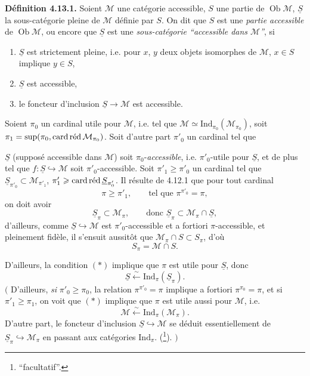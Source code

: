 \documentclass[11pt]{article}
\newcommand{\printedpage}[1]{\marginpar{\footnotesize p.~#1}}
\newcommand{\msp}[1]{\marginpar{\footnotesize [#1]}}
\newcommand{\Ind}{\mathrm{Ind}}
\newcommand{\Ob}{\operatorname{Ob}}
\newcommand{\card}{\operatorname{card}}
\newcommand{\M}{\mathcal{M}}
\newcommand{\red}{\mathop{\textup{réd}}\nolimits}
\newcommand{\uS}{\underline{S}}
\begin{document}
\textbf{Définition 4.13.1.} Soient $\M$ une catégorie accessible, $S$ une partie de $\Ob\M$, $\uS$ la sous-catégorie pleine de $\M$ définie par $S$. On dit que $S$ est une \textit{partie accessible} de $\Ob\M$, ou encore que $\uS$ est une \textit{sous-catégorie “accessible dans $\M$”}, si
\printedpage{105}
\begin{enumerate}
\item[a)] $\uS$ est strictement pleine, i.e. pour $x$, $y$ deux objets isomorphes de $\M$, $x \in S$ implique $y \in S$,
\item[b)] $\uS$ est accessible,
\item[c)] le foncteur d'inclusion $\uS \longrightarrow \M$ est accessible.
\end{enumerate}
Soient $\pi_0$ un cardinal utile pour $\M$, i.e. tel que $\M \simeq \Ind_{\pi_0}(\M_{\pi_0})$, soit $\pi_1 = \sup(\pi_0, \card\red\M_{\pi_0})$. Soit d'autre part $\pi'_0$ un cardinal tel que

\msp{page 282}
$\uS$ (supposé accessible dans $\M$) soit $\pi_0$-\textit{accessible}, i.e. $\pi'_0$-utile pour $\uS$, et de plus tel %
que $f : \uS \hookrightarrow \M$ soit $\pi'_0$-accessible. Soit $\pi'_1 \geqslant \pi'_0$ un cardinal tel que $\uS_{\pi'_0} \subset \M_{\pi'_1}$, $\pi'_1 \geqslant \card\red\uS_{\pi'_0}$. Il résulte de 4.12.1 que pour tout cardinal
\[
\pi \geqslant \pi'_1 , \qquad \text{tel que } \pi^{\pi'_0} = \pi, \tag*{$(*)$}
\]
on doit avoir
\[
\uS_\pi \subset \M_\pi , \qquad \text{donc } \uS_\pi \subset \M_\pi \cap \uS,
\]
d'ailleurs, comme $\uS \hookrightarrow \M$ est $\pi'_0$-accessible et a fortiori $\pi$-accessible, et pleinement fidèle, il s'ensuit aussitôt que $\M_\pi \cap S \subset S_\pi$, d'où
\[
S_\pi = \M \cap S . %
\]

\msp{page 283}
D'ailleurs, la condition $(*)$ implique que $\pi$ est utile pour $\uS$, donc
\[
\uS \xleftarrow{\sim} \Ind_\pi(\uS_\pi) .
\]
$\Big($ D'ailleurs, \textit{si} $\pi'_0 \geqslant \pi_0$, la relation $\pi^{\pi'_0} = \pi$ implique a fortiori $\pi^{\pi_0} = \pi$, et si $\pi'_1 \geqslant \pi_1$, on voit que $(*)$ implique que $\pi$ est utile aussi pour $\M$, i.e.
\[
\M \xleftarrow{\sim} \Ind_\pi(\M_\pi) .
\]
D'autre part, le foncteur d'inclusion $\uS \hookrightarrow \M$ se déduit essentiellement de $\uS_\pi \hookrightarrow \M_\pi$ en passant aux catégories $\Ind_\pi$. (\footnote[116]{ “facultatif”.}). $\Big)$
\end{document}
